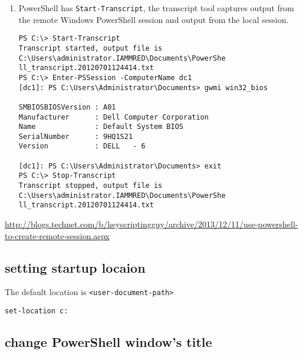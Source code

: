 \begin{enumerate}
\begin{verbatim}
[dc1]: PS C:\Users\Administrator\Documents> exit
PS C:\> Get-PSSession

 Id Name            ComputerName    State         ConfigurationName     Availability
 -- ----            ------------    -----         -----------------     ------------
  8 Session8        dc1             Opened        Microsoft.PowerShell     Available

PS C:\> Get-PSSession | Remove-PSSession
PS C:\>
\end{verbatim}  
  
  \item PowerShell has \verb!Start-Transcript!, the transcript tool captures output from the remote Windows PowerShell session and output from the local session.
  
\begin{verbatim}
PS C:\> Start-Transcript
Transcript started, output file is C:\Users\administrator.IAMMRED\Documents\PowerShe
ll_transcript.20120701124414.txt
PS C:\> Enter-PSSession -ComputerName dc1
[dc1]: PS C:\Users\Administrator\Documents> gwmi win32_bios

SMBIOSBIOSVersion : A01
Manufacturer      : Dell Computer Corporation
Name              : Default System BIOS
SerialNumber      : 9HQ1S21
Version           : DELL   - 6

[dc1]: PS C:\Users\Administrator\Documents> exit
PS C:\> Stop-Transcript
Transcript stopped, output file is C:\Users\administrator.IAMMRED\Documents\PowerShe
ll_transcript.20120701124414.txt
\end{verbatim}
  
\end{enumerate}
 
\url{http://blogs.technet.com/b/heyscriptingguy/archive/2013/12/11/use-powershell-to-create-remote-session.aspx}
 
\subsection{setting startup locaion}

The default location is \verb!<user-document-path>!
\begin{verbatim}
set-location c:
\end{verbatim}


\subsection{change PowerShell window's title}

